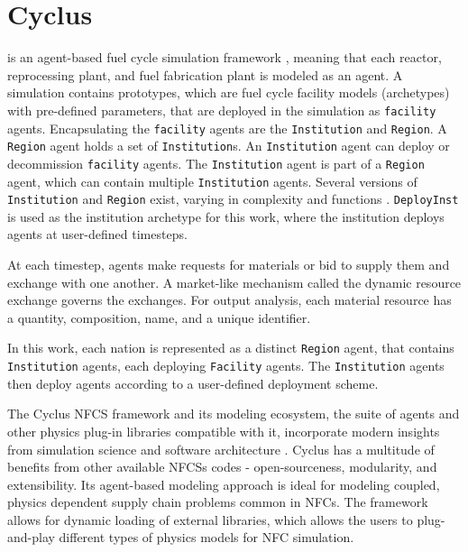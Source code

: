 \section{Cyclus}

\Cyclus is an agent-based fuel cycle simulation framework 
\cite{huff_fundamental_2016}, meaning
that each reactor, reprocessing plant, and fuel fabrication plant is modeled as an agent.
A \Cyclus simulation contains prototypes, which are fuel cycle facility models (archetypes) with
pre-defined parameters, that are deployed in the simulation as \texttt{facility} agents.
Encapsulating the \texttt{facility} agents are the \texttt{Institution} and \texttt{Region}.
A \texttt{Region} agent holds a set of \texttt{Institution}s. 
An \texttt{Institution} agent can deploy or decommission \texttt{facility} agents.
The \texttt{Institution} agent is part of a \texttt{Region} agent,
which can contain multiple \texttt{Institution} agents. Several versions of \texttt{Institution}
and \texttt{Region} exist, varying in complexity and functions \cite{huff_extensions_2014}.
\texttt{DeployInst} is used as the institution archetype for this work, where the institution
deploys agents at user-defined timesteps. 

At each timestep,
agents make requests for materials or bid to supply them and exchange
with one another. A market-like mechanism called the dynamic resource exchange
\cite{gidden_agent-based_2015} governs the exchanges.
For output analysis, each material resource has a quantity, composition, name, and a unique identifier.

In this work, each nation is represented as a distinct \texttt{Region} agent,
that contains \texttt{Institution} agents, each deploying  \texttt{Facility} 
agents. The \texttt{Institution} agents then deploy agents according to 
a user-defined deployment scheme.

The Cyclus \gls{NFCS} framework and its
modeling ecosystem, the suite of agents and other
physics plug-in libraries compatible with it, incorporate
modern insights from simulation science and software
architecture \cite{huff_fundamental_2016}. Cyclus
has a multitude of benefits from other available
\glspl{NFCS} codes - open-sourceness, modularity,
and extensibility. Its agent-based modeling approach
is ideal for modeling coupled, physics dependent
supply chain problems common in \glspl{NFC}.
The framework allows for dynamic loading of 
external libraries, which allows the users to plug-and-play
different types of physics models for \gls{NFC}
simulation.

